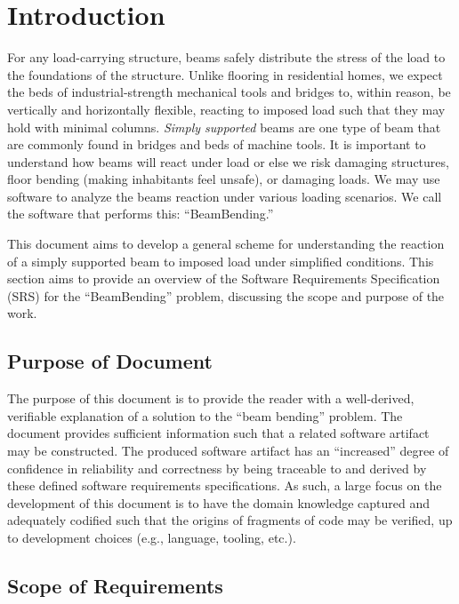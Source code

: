 \documentclass[12pt]{article}
\begin{document}
\section{Introduction}

For any load-carrying structure, beams safely distribute the stress of the load
to the foundations of the structure. Unlike flooring in residential homes, we
expect the beds of industrial-strength mechanical tools and bridges to, within
reason, be vertically and horizontally flexible, reacting to imposed load such
that they may hold with minimal columns. \textit{Simply supported} beams are one
type of beam that are commonly found in bridges and beds of machine tools. It is
important to understand how beams will react under load or else we risk damaging
structures, floor bending (making inhabitants feel unsafe), or damaging loads.
We may use software to analyze the beams reaction under various loading
scenarios. We call the software that performs this: ``BeamBending.''

This document aims to develop a general scheme for understanding the reaction of
a simply supported beam to imposed load under simplified conditions. This
section aims to provide an overview of the Software Requirements Specification
(SRS) for the ``BeamBending'' problem, discussing the scope and purpose of the
work.

\subsection{Purpose of Document}

The purpose of this document is to provide the reader with a well-derived,
verifiable explanation of a solution to the ``beam bending'' problem. The
document provides sufficient information such that a related software artifact
may be constructed. The produced software artifact has an ``increased'' degree
of confidence in reliability and correctness by being traceable to and derived
by these defined software requirements specifications. As such, a large focus on
the development of this document is to have the domain knowledge captured and
adequately codified such that the origins of fragments of code may be verified,
up to development choices (e.g., language, tooling, etc.).

\subsection{Scope of Requirements}
\label{ssec_scope}
\end{document}
